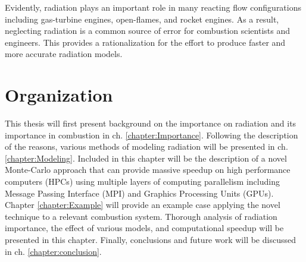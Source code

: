 Evidently, radiation plays an important role in many reacting flow configurations including gas-turbine engines, open-flames, and rocket engines.
As a result, neglecting radiation is a common source of error for combustion scientists and engineers. 
This provides a rationalization for the effort to produce faster and more accurate radiation models.


\section{Organization}
This thesis will first present background on the importance on radiation and its importance in combustion in ch. \ref{chapter:Importance}. 
Following the description of the reasons, various methods of modeling radiation will be presented in ch. \ref{chapter:Modeling}. Included in this chapter will be the description of a novel Monte-Carlo approach that can provide massive speedup on high performance computers (HPCs) using multiple layers of computing parallelism including Message Passing Interface (MPI) and Graphics Processing Units (GPUs).
Chapter \ref{chapter:Example} will provide an example case applying the novel technique to a relevant combustion system. Thorough analysis of radiation importance, the effect of various models, and computational speedup will be presented in this chapter.
Finally, conclusions and future work will be discussed in ch. \ref{chapter:conclusion}.